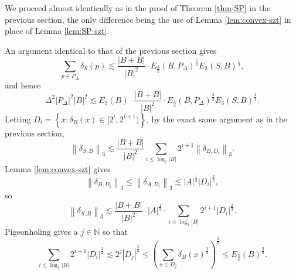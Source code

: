 \documentclass[reqno]{amsart}
\numberwithin{equation}{section}
\begin{document}
We proceed almost identically as in the proof of Theorem \ref{thm-SP} in the previous section,
the only difference being the use of Lemma \ref{lem:convex-szt} in place of Lemma \ref{lem:SP-szt}.

An argument identical to that of the previous section gives
\[
    \sum _{p\in P_{\Delta} } \delta_{S} (p) \lesssim \frac{\left\lvert B+B \right\rvert }{\left\lvert B \right\rvert ^{2}} \cdot E_{\frac{3}{2} } (B,P_{\Delta} )^{\frac{2}{3} } E_{3} (S,B)^{\frac{1}{3} }
,\]
and hence
\begin{equation} \label{eq:convex-to-substitute}
    \Delta^{2}\left\lvert P_{\Delta}  \right\rvert ^{2} \left\lvert B \right\rvert ^{2} \lesssim E_3(B) \cdot \frac{\left\lvert B+B \right\rvert }{\left\lvert B \right\rvert ^{2}}\cdot  E_{\frac{3}{2} } (B,P_{\Delta} )^{\frac{2}{3} } E_{3} (S,  B)^{\frac{1}{3} }.
\end{equation}
Letting \(D_{i} = \left\{ x : \delta_{B} (x) \in [2^{i},2^{i+1}) \right\} \), by the exact same argument as in the previous section,
\[
    \left\lVert \delta_{S,B}  \right\rVert _{3}   \lesssim \frac{\left\lvert B+B \right\rvert }{\left\lvert B \right\rvert ^{2}} \sum _{i \leq \log _{2} \left\lvert B \right\rvert } 2^{i+1} \left\lVert \delta_{B,D_{i} }  \right\rVert _{3} 
.\]
Lemma \ref{lem:convex-szt} gives
\[
    \left\lVert \delta_{B,D_{i} }  \right\rVert _{3} \leq \left\lVert \delta_{A,D_{i} }  \right\rVert _{3} \lesssim \left\lvert A \right\rvert ^{\frac{1}{3} } \left\lvert D_{i}  \right\rvert ^{\frac{2}{3} }
,\]
so
\[
    \left\lVert \delta_{S,B}  \right\rVert _{3} \lesssim \frac{\left\lvert B+B \right\rvert }{\left\lvert B \right\rvert ^{2}} \cdot \left\lvert A \right\rvert ^{\frac{1}{3} }\cdot \sum _{i \leq \log _{2} \left\lvert B \right\rvert } 2^{i+1}\left\lvert D_{i}  \right\rvert ^{\frac{2}{3} }
.\]
Pigeonholing gives a \(j \in \mathbb{N}  \) so that
\[
    \sum _{i \leq \log _{2} \left\lvert B \right\rvert } 2^{i+1} \left\lvert D_{i}  \right\rvert ^{\frac{2}{3} } \lesssim 2^{j} \left\lvert D_{j}  \right\rvert ^{\frac{2}{3} } \leq \left(  \sum _{x \in D_{j} } \delta_{B} (x) ^{\frac{3}{2} } \right) ^{\frac{2}{3} } \leq  E_{\frac{3}{2} } (B) ^{\frac{2}{3} }
.\]
\end{document}
